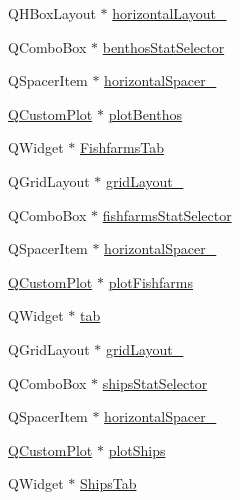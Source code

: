 \begin{DoxyCompactItemize}
\item 
Q\+H\+Box\+Layout $\ast$ \mbox{\hyperlink{class_ui___main_window_a2afb915e1492b7e6704db4918c1e5e80}{horizontal\+Layout\+\_}}
\item 
Q\+Combo\+Box $\ast$ \mbox{\hyperlink{class_ui___main_window_ad554b8992a1e59072fad8bb280647477}{benthos\+Stat\+Selector}}
\item 
Q\+Spacer\+Item $\ast$ \mbox{\hyperlink{class_ui___main_window_a100e0ffd031f76754eba5078288deabf}{horizontal\+Spacer\+\_}}
\item 
\mbox{\hyperlink{class_q_custom_plot}{Q\+Custom\+Plot}} $\ast$ \mbox{\hyperlink{class_ui___main_window_abcb13d43f175f556549e2e27c1667b5d}{plot\+Benthos}}
\item 
Q\+Widget $\ast$ \mbox{\hyperlink{class_ui___main_window_a32d65a3d93b3ceafd76446f042922305}{Fishfarms\+Tab}}
\item 
Q\+Grid\+Layout $\ast$ \mbox{\hyperlink{class_ui___main_window_af42ea7d4c2e893181caad21e28166932}{grid\+Layout\+\_}}
\item 
Q\+Combo\+Box $\ast$ \mbox{\hyperlink{class_ui___main_window_a13816104b9d1b31becc2472e25a39177}{fishfarms\+Stat\+Selector}}
\item 
Q\+Spacer\+Item $\ast$ \mbox{\hyperlink{class_ui___main_window_a161530c7a59fdb65820f045953376b9b}{horizontal\+Spacer\+\_}}
\item 
\mbox{\hyperlink{class_q_custom_plot}{Q\+Custom\+Plot}} $\ast$ \mbox{\hyperlink{class_ui___main_window_a8ac4bc3b1946810f5dcc57ab4167c706}{plot\+Fishfarms}}
\item 
Q\+Widget $\ast$ \mbox{\hyperlink{class_ui___main_window_a3efc28c664e9f5115095aafbbc5ac6bc}{tab}}
\item 
Q\+Grid\+Layout $\ast$ \mbox{\hyperlink{class_ui___main_window_a8ee86315639f324b17708efc7dbe8b19}{grid\+Layout\+\_}}
\item 
Q\+Combo\+Box $\ast$ \mbox{\hyperlink{class_ui___main_window_ac58eaabbc5d46898d40d7f3378d3a984}{ships\+Stat\+Selector}}
\item 
Q\+Spacer\+Item $\ast$ \mbox{\hyperlink{class_ui___main_window_af2b7290d54affa41367b1006fba794f6}{horizontal\+Spacer\+\_}}
\item 
\mbox{\hyperlink{class_q_custom_plot}{Q\+Custom\+Plot}} $\ast$ \mbox{\hyperlink{class_ui___main_window_a9bb563360b77db7fa72f6ce2fb15a13e}{plot\+Ships}}
\item 
Q\+Widget $\ast$ \mbox{\hyperlink{class_ui___main_window_af7c194ef216c2c61b8365e7d9b59c2ba}{Ships\+Tab}}
\item 

\end{DoxyCompactItemize}
